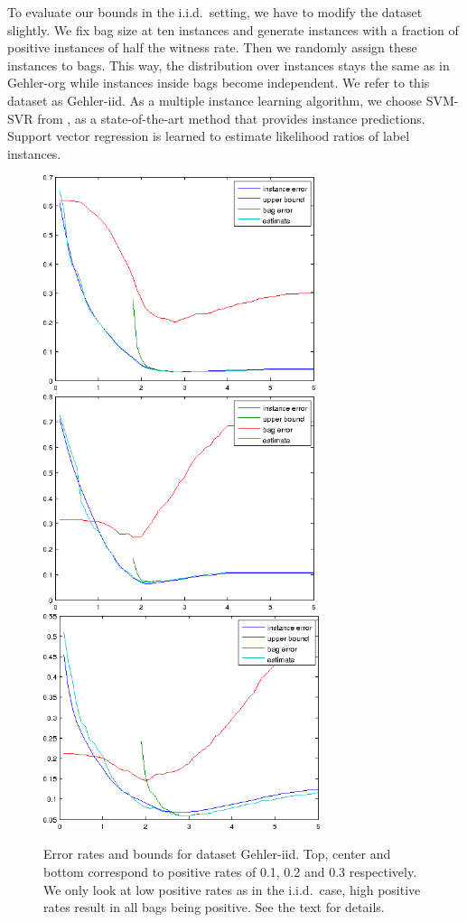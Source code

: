To evaluate our bounds in the i.i.d.\ setting, we have to modify the dataset slightly. We fix bag size at ten instances and generate instances
with a fraction of positive instances of half the witness rate. Then we randomly assign these instances to bags.
This way, the distribution over instances stays the same as in Gehler-org while instances inside bags become independent.
We refer to this dataset as Gehler-iid.
As a multiple instance learning algorithm, we choose SVM-SVR from \citet{liconvex2010}, as a state-of-the-art method that
provides instance predictions. Support vector regression is learned to estimate likelihood ratios of label instances.

\begin{figure}[tbp]
	\begin{center}
		\includegraphics[height=63mm]{images/iid_01.png}
		\includegraphics[height=63mm]{images/iid_02.png}
		\includegraphics[height=63mm]{images/iid_03.png}
	\end{center}
	\caption{Error rates and bounds for dataset Gehler-iid. Top, center and bottom correspond to positive rates of 0.1, 0.2 and 0.3 respectively.
    We only look at low positive rates as in the i.i.d.\ case, high positive rates result in all bags being positive.
    See the text for details.}
\end{figure}

